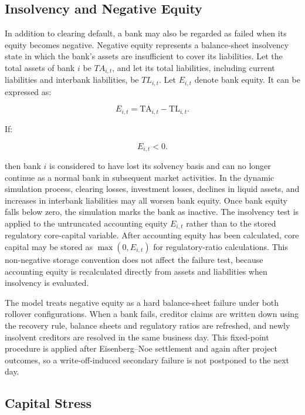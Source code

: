 \subsection{Insolvency and Negative Equity}

In addition to clearing default, a bank may also be regarded as failed
when its equity becomes negative. Negative equity represents a
balance-sheet insolvency state in which the bank's assets are
insufficient to cover its liabilities. Let the total assets of bank
\(i\) be \(TA_{i,t}\), and let its total liabilities, including current
liabilities and interbank liabilities, be \(TL_{i,t}\). Let \(E_{i,t}\) denote bank equity. It can be expressed as:


\begin{equation}
E_{i,t}=\mathrm{TA}_{i,t}-\mathrm{TL}_{i,t}.
\end{equation}


If:


\begin{equation}
E_{i,t}<0.
\end{equation}


then bank \(i\) is considered to have lost its solvency basis and can no
longer continue as a normal bank in subsequent market activities. In the
dynamic simulation process, clearing losses, investment losses, declines
in liquid assets, and increases in interbank liabilities may all worsen
bank equity. Once bank equity falls below zero, the simulation marks the
bank as inactive. The insolvency test is applied to the untruncated accounting equity
$E_{i,t}$ rather than to the stored regulatory core-capital variable.
After accounting equity has been calculated, core capital may be stored
as $\max(0,E_{i,t})$ for regulatory-ratio calculations. This non-negative
storage convention does not affect the failure test, because accounting
equity is recalculated directly from assets and liabilities when
insolvency is evaluated.

The model treats negative equity as a hard balance-sheet failure under
both rollover configurations. When a bank fails, creditor claims are
written down using the recovery rule, balance sheets and regulatory
ratios are refreshed, and newly insolvent creditors are resolved in the
same business day. This fixed-point procedure is applied after
Eisenberg--Noe settlement and again after project outcomes, so a
write-off-induced secondary failure is not postponed to the next day.

\subsection{Capital Stress}


